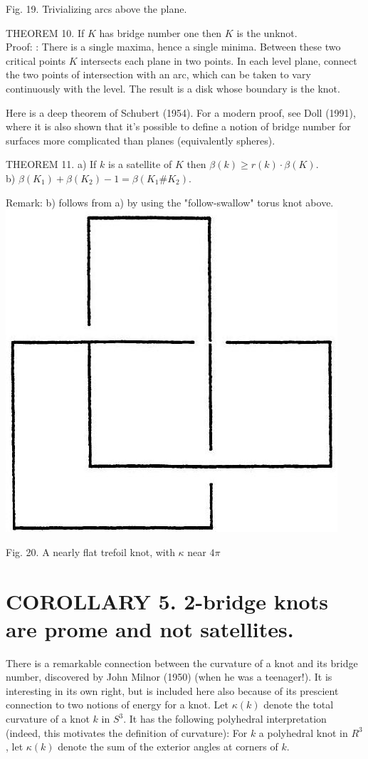 \documentclass[10pt, letterpaper]{article}
\begin{document}
Fig. 19. Trivializing arcs above the plane.

THEOREM 10. If $K$ has bridge number one then $K$ is the unknot.\\
Proof: : There is a single maxima, hence a single minima. Between these two critical points $K$ intersects each plane in two points. In each level plane, connect the two points of intersection with an arc, which can be taken to vary continuously with the level. The result is a disk whose boundary is the knot.

Here is a deep theorem of Schubert (1954). For a modern proof, see Doll (1991), where it is also shown that it's possible to define a notion of bridge number for surfaces more complicated than planes (equivalently spheres).

THEOREM 11. a) If $k$ is a satellite of $K$ then $\beta(k) \geq r(k) \cdot \beta(K)$.\\
b) $\beta\left(K_{1}\right)+\beta\left(K_{2}\right)-1=\beta\left(K_{1} \# K_{2}\right)$.

Remark: b) follows from a) by using the "follow-swallow" torus knot above.\\
\includegraphics[scale=0.2, center]{2025_05_21_037de704f595ce642d3eg-089}

Fig. 20. A nearly flat trefoil knot, with $\kappa$ near $4 \pi$

\section*{COROLLARY 5. 2-bridge knots are prome and not satellites.}
There is a remarkable connection between the curvature of a knot and its bridge number, discovered by John Milnor (1950) (when he was a teenager!). It is interesting in its own right, but is included here also because of its prescient connection to two notions of energy for a knot. Let $\kappa(k)$ denote the total curvature of a knot $k$ in $S^{3}$. It has the following polyhedral interpretation (indeed, this motivates the definition of curvature): For $k$ a polyhedral knot in $R^{3}$, let $\kappa(k)$ denote the sum of the exterior angles at corners of $k$.
\end{document}
